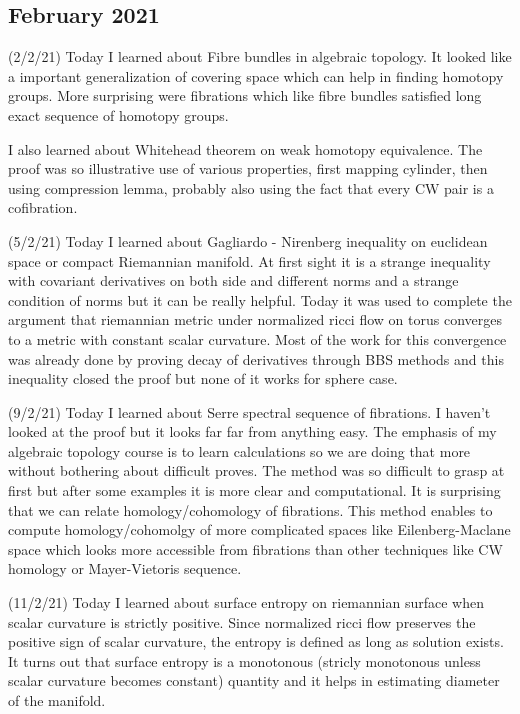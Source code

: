 \documentclass[12pt,a4paper]{article}
\begin{document}
 
 \subsection*{February 2021}
 
 \quad (2/2/21) Today I learned about Fibre bundles in algebraic topology. It looked like a important generalization of covering space which can help in finding homotopy groups. More surprising were fibrations which like fibre bundles satisfied long exact sequence of homotopy groups.
 
 I also learned about Whitehead theorem on weak homotopy equivalence. The proof was so illustrative use of various properties, first mapping cylinder, then using compression lemma, probably also using the fact that every CW pair is a cofibration.
 
 
 (5/2/21) Today I learned about Gagliardo - Nirenberg inequality on euclidean space or compact Riemannian manifold. At first sight it is a strange inequality with covariant derivatives on both side and different norms and a strange condition of norms but it can be really helpful. Today it was used to complete the argument that riemannian metric under normalized ricci flow on torus converges to a metric with constant scalar curvature. Most of the work for this convergence was already done by proving decay of derivatives through BBS methods and this inequality closed the proof but none of it works for sphere case. 
 
 (9/2/21) Today I learned about Serre spectral sequence of fibrations. I haven't looked at the proof but it looks far far from anything easy. The emphasis of my algebraic topology course is to learn calculations so we are doing that more without bothering about difficult proves. The method was so difficult to grasp at first but after some examples it is more clear and computational. It is surprising that we can relate homology/cohomology of fibrations. This method enables to compute homology/cohomolgy of more complicated spaces like Eilenberg-Maclane space which looks more accessible from fibrations than other techniques like CW homology or Mayer-Vietoris sequence. 
 
 (11/2/21) Today I learned about surface entropy on riemannian surface when scalar curvature is strictly positive. Since normalized ricci flow preserves the positive sign of scalar curvature, the entropy is defined as long as solution exists. It turns out that surface entropy is a monotonous (stricly monotonous unless scalar curvature becomes constant) quantity and it helps in estimating diameter of the manifold.
  
\end{document}
